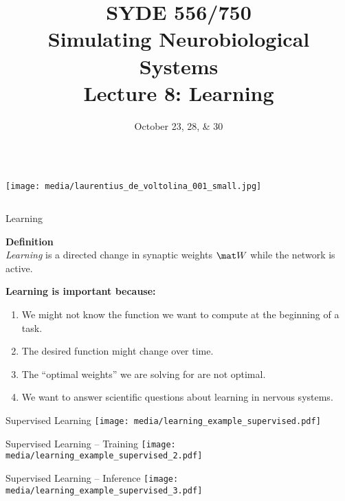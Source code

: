 \documentclass[handout,aspectratio=169]{beamer}
\date{October 23, 28, \& 30}
\title{SYDE 556/750 \\ Simulating Neurobiological Systems \\ Lecture 8: Learning}
\begin{document}
	
	\begin{frame}{}
		\vspace{0.5cm}
		\begin{columns}[c]
			\MakeTitle
			\texttt{[image: media/laurentius\_de\_voltolina\_001\_small.jpg]}
		\end{columns}
	\end{frame}

  \begin{frame}{Learning}
    \begin{mdframed}
      \textbf{Definition}\\
      \emph{Learning} is a directed change in synaptic weights $\mat W$ while the network is active.
    \end{mdframed}  
    \vspace{.75cm}
    \textbf{Learning is important because:}
    \begin{enumerate}
      \item <2->We might not know the function we want to compute at the beginning of a task.
      \item <3->The desired function might change over time.
      \item <4->The \enquote{optimal weights} we are solving for are not optimal.
      \item <5->We want to answer scientific questions about learning in nervous systems.
    \end{enumerate}
	\end{frame}

	\begin{frame}{Supervised Learning}
		\centering
		\texttt{[image: media/learning\_example\_supervised.pdf]}
	\end{frame}

	\begin{frame}{Supervised Learning -- Training}
		\centering
		\texttt{[image: media/learning\_example\_supervised\_2.pdf]}
	\end{frame}

	\begin{frame}{Supervised Learning -- Inference}
		\centering
		\texttt{[image: media/learning\_example\_supervised\_3.pdf]}
	\end{frame}
\end{document}
